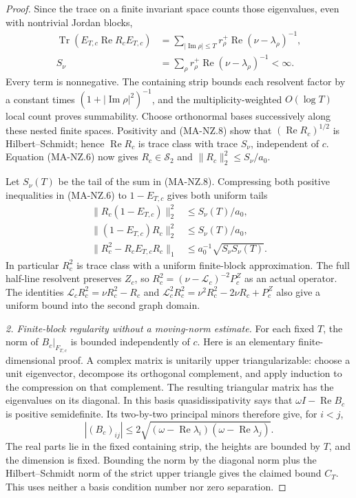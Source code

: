 \begin{proof}
Since the trace on a finite invariant space counts those
eigenvalues, even with nontrivial Jordan blocks,
\[
 \begin{aligned}
 \operatorname{Tr}(E_{T,c}\operatorname{Re}R_cE_{T,c})
   &=\sum_{|\operatorname{Im}\rho|\le T}
       r_\rho^+\operatorname{Re}(\nu-\lambda_\rho)^{-1},\\
 S_\nu&=\sum_\rho
       r_\rho^+\operatorname{Re}(\nu-\lambda_\rho)^{-1}<\infty.
 \end{aligned}
 \tag{MA-NZ.8}
\]
Every term is nonnegative.  The containing strip bounds
each resolvent factor by a constant times
$(1+|\operatorname{Im}\rho|^2)^{-1}$, and the
multiplicity-weighted $O(\log T)$ local count proves
summability.
Choose orthonormal bases successively along these nested
finite spaces.  Positivity and (MA-NZ.8) show that
$(\operatorname{Re}R_c)^{1/2}$ is Hilbert--Schmidt;
hence $\operatorname{Re}R_c$ is trace class with trace
$S_\nu$, independent of $c$.
Equation (MA-NZ.6) now gives $R_c\in\mathcal S_2$ and
$\|R_c\|_2^2\le S_\nu/a_0$.

Let $S_\nu(T)$ be the tail of the sum in (MA-NZ.8).
Compressing both positive inequalities in (MA-NZ.6)
to $1-E_{T,c}$ gives both uniform tails
\[
 \begin{aligned}
 \|R_c(1-E_{T,c})\|_2^2&\le S_\nu(T)/a_0,\\
 \|(1-E_{T,c})R_c\|_2^2&\le S_\nu(T)/a_0,\\
 \|R_c^2-R_cE_{T,c}R_c\|_1
       &\le a_0^{-1}\sqrt{S_\nu S_\nu(T)}.
 \end{aligned}
 \tag{MA-NZ.9}
\]
In particular $R_c^2$ is trace class with a uniform
finite-block approximation.  The full half-line resolvent
preserves $Z_c$, so
$R_c^2=(\nu-\mathcal L_c)^{-2}P_c^Z$ as an actual operator.
The identities
$\mathcal L_cR_c^2=\nu R_c^2-R_c$ and
$\mathcal L_c^2R_c^2=\nu^2R_c^2-2\nu R_c+P_c^Z$
also give a uniform bound into the second graph domain.

\emph{2. Finite-block regularity without a moving-norm estimate.}
For each fixed $T$, the norm of $B_c|_{F_{T,c}}$ is
bounded independently of $c$.
Here is an elementary finite-dimensional proof.
A complex matrix is unitarily upper triangularizable:
choose a unit eigenvector, decompose its orthogonal
complement, and apply induction to the compression on
that complement.  The resulting triangular matrix has
the eigenvalues on its diagonal.
In this basis quasidissipativity says that
$\omega I-\operatorname{Re}B_c$ is positive semidefinite.
Its two-by-two principal minors therefore give, for $i<j$,
\[
 |(B_c)_{ij}|
   \le2\sqrt{(\omega-\operatorname{Re}\lambda_i)
                     (\omega-\operatorname{Re}\lambda_j)}.
 \tag{MA-NZ.10}
\]
The real parts lie in the fixed containing strip, the
heights are bounded by $T$, and the dimension is fixed.
Bounding the norm by the diagonal norm plus the
Hilbert--Schmidt norm of the strict upper triangle
gives the claimed bound $C_T$.
This uses neither a basis condition number nor zero separation.


\end{proof}
